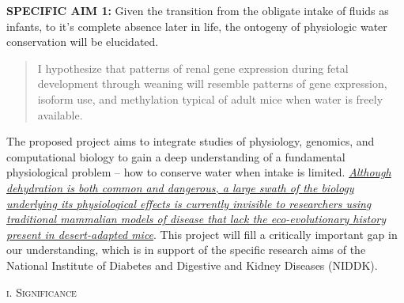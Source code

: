 \documentclass[11pt]{article}
\begin{document}
\noindent \textbf{SPECIFIC AIM 1:} Given the transition from the obligate intake of fluids as infants, to it’s complete absence later in life, the ontogeny of physiologic water conservation will be elucidated.

\begin{quote}
I hypothesize that patterns of renal gene expression during fetal development through weaning will resemble patterns of gene expression, isoform use, and methylation typical of adult mice when water is freely available. 

\end{quote}

The proposed project aims to integrate studies of physiology, genomics, and computational biology to gain a deep understanding of a fundamental physiological problem – how to conserve water when intake is limited. \ul{\emph{Although dehydration is both common and dangerous, a large swath of the biology underlying its physiological effects is currently invisible to researchers using traditional mammalian models of disease that lack the eco-evolutionary history present in desert-adapted mice}}.  This project will fill a critically important gap in our understanding, which is in support of the specific research aims of the National Institute of Diabetes and Digestive and Kidney Diseases (NIDDK).

\newpage
{}
\pagestyle{fancy}
\setcounter{page}{2}
\normalsize 
\begin{center}
\textsc{{i. Significance}} \\
\end{center}
\end{document}
